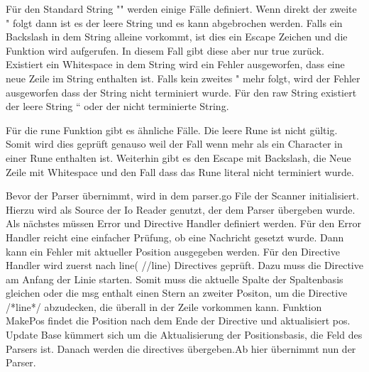 Für den Standard String "" werden einige Fälle definiert. Wenn direkt der zweite " folgt dann ist es der leere String und es kann abgebrochen werden. Falls ein Backslash in dem String alleine vorkommt, ist dies ein Escape Zeichen und die Funktion wird aufgerufen. In diesem Fall gibt diese aber nur true zurück. Existiert ein Whitespace in dem String wird ein Fehler ausgeworfen, dass eine neue Zeile im String enthalten ist. Falls kein zweites " mehr folgt, wird der Fehler ausgeworfen dass der String nicht terminiert wurde. Für den raw String existiert der leere String `` oder der nicht terminierte String.

Für die rune Funktion gibt es ähnliche Fälle. Die leere Rune ist nicht gültig. Somit wird dies geprüft genauso weil der Fall wenn mehr als ein Character in einer Rune enthalten ist. Weiterhin gibt es den Escape mit Backslash, die Neue Zeile mit Whitespace und den Fall dass das Rune literal nicht terminiert wurde.

Bevor der Parser übernimmt, wird in dem parser.go File der Scanner initialisiert. Hierzu wird als Source der Io Reader genutzt, der dem Parser übergeben wurde. Als nächstes müssen Error und Directive Handler definiert werden. Für den Error Handler reicht eine einfacher Prüfung, ob eine Nachricht gesetzt wurde. Dann kann ein Fehler mit aktueller Position ausgegeben werden. Für den Directive Handler wird zuerst nach line( //line) Directives geprüft. Dazu muss die Directive am Anfang der Linie starten. Somit muss die aktuelle Spalte der Spaltenbasis gleichen oder die msg enthalt einen Stern an zweiter Positon, um die Directive /*line*/ abzudecken, die überall in der Zeile vorkommen kann. Funktion MakePos findet die Position nach dem Ende der Directive und aktualisiert pos. Update Base kümmert sich um die Aktualisierung der Positionsbasis, die Feld des Parsers ist. Danach werden die directives übergeben.Ab hier übernimmt nun der Parser.